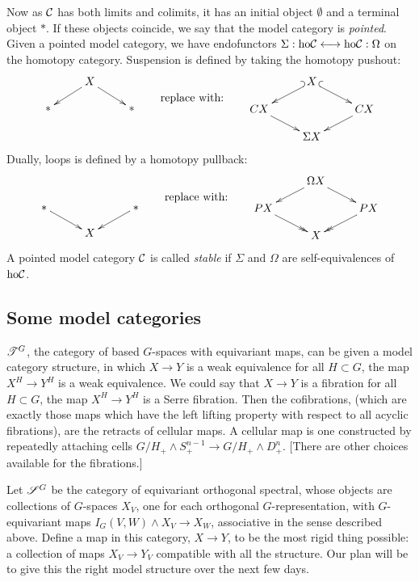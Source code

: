 \documentclass[11pt]{article}
\begin{document}
Now as $\mathcal{C}$ has both limits and colimits, it has an initial object $\emptyset$ and a terminal object $*$. If these objects coincide, we say that the model category is \emph{pointed}. Given a pointed model category, we have endofunctors $\Sigma:\textup{ho}\mathcal{C}\longleftrightarrow\textup{ho}\mathcal{C}:\Omega$ on the homotopy category. Suspension is defined by taking the homotopy pushout:
\[\xymatrix@R=.4cm{
&X\ar[dr]\ar[dl]\\
\ast&&\ast
}
\qquad\raisebox{-.5cm}{replace with:}\qquad
\xymatrix@R=.4cm{
&X\ar@{^{(}->}[dr]\ar@{_{(}->}[dl]\\
CX\ar[dr]&&CX\ar[dl]\\
&\Sigma X
}\]
Dually, loops is defined by a homotopy pullback:
\[\xymatrix@R=.4cm{
&\text{$\phantom{\Omega X}$}\\
\ast\ar[dr]&&\ast\ar[dl]\\
&X
}
\qquad\raisebox{-.5cm}{replace with:}\qquad
\xymatrix@R=.4cm{
&\Omega X\ar[dr]\ar[dl]\\
PX\ar@{->>}[dr]&&PX\ar@{->>}[dl]\\
&X
}\]
A pointed model category $\mathcal{C}$ is called \emph{stable} if $\Sigma$ and $\Omega$ are self-equivalences of $\textup{ho}\mathcal{C}$.
\subsection*{Some model categories}
$\mathscr{T}^G$, the category of based $G$-spaces with equivariant maps, can be given a model category structure, in which $X\to Y$ is a weak equivalence \Iff for all $H\subset G$, the map $X^H\to Y^H$ is a weak equivalence. We could say that $X\to Y$ is a fibration \Iff  for all $H\subset G$, the map $X^H\to Y^H$ is a Serre fibration. Then the cofibrations, (which are exactly those maps which have the left lifting property with respect to all acyclic fibrations), are the retracts of cellular maps. A cellular map is one constructed by repeatedly attaching cells $G/H_+\wedge S_+^{n-1}\to G/H_+\wedge D_+^{n}$. [There are other choices available for the fibrations.]

Let $\mathscr{S}^G$ be the category of equivariant orthogonal spectral, whose objects are collections of $G$-spaces $X_V$, one for each orthogonal $G$-representation, with $G$-equivariant maps $I_G(V,W)\wedge X_V\to X_W$, associative in the sense described above. Define a map in this category, $X\to Y$, to be the most rigid thing possible: a collection of maps $X_V\to Y_V$ compatible with all the structure. Our plan will be to give this the right model structure over the next few days.
\end{document}
